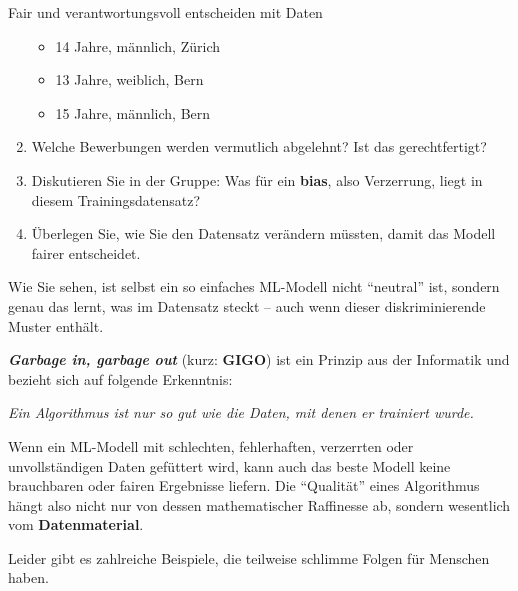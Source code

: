 \begin{lpu}{Fair und verantwortungsvoll entscheiden mit Daten}
\begin{aufgabe}{6}
\begin{enumerate}
  \begin{itemize}
    \item 14 Jahre, männlich, Zürich
    \item 13 Jahre, weiblich, Bern
    \item 15 Jahre, männlich, Bern
  \end{itemize}

  \item Welche Bewerbungen werden vermutlich abgelehnt? Ist das gerechtfertigt?
  \item Diskutieren Sie in der Gruppe: Was für ein \textbf{bias}, also Verzerrung, liegt in diesem Trainingsdatensatz?
  \item Überlegen Sie, wie Sie den Datensatz verändern müssten, damit das Modell fairer entscheidet.
\end{enumerate}
\end{aufgabe}

Wie Sie sehen, ist selbst ein so einfaches ML-Modell nicht ``neutral'' ist, sondern genau das lernt, was im Datensatz steckt – auch wenn dieser diskriminierende Muster enthält.

\begin{theorie}

\textbf{\textit{Garbage in, garbage out}} (kurz: \textbf{GIGO}) ist ein Prinzip aus der Informatik und bezieht sich auf folgende Erkenntnis:

\begin{center}
\emph{Ein Algorithmus ist nur so gut wie die Daten, mit denen er trainiert wurde.}
\end{center}

Wenn ein ML-Modell mit schlechten, fehlerhaften, verzerrten oder unvollständigen Daten gefüttert wird, kann auch das beste Modell keine brauchbaren oder fairen Ergebnisse liefern. Die ``Qualität'' eines Algorithmus hängt also nicht nur von dessen mathematischer Raffinesse ab, sondern wesentlich vom \textbf{Datenmaterial}.
\end{theorie}

Leider gibt es zahlreiche Beispiele, die teilweise schlimme Folgen für Menschen haben.


\end{lpu}
